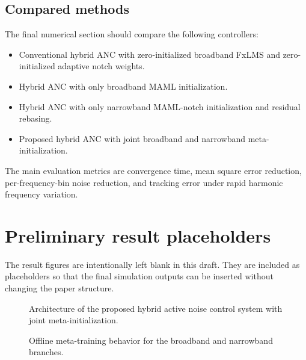 \documentclass{internoise2026}
\begin{document}
\subsection{Compared methods}

The final numerical section should compare the following controllers:
\begin{itemize}[noitemsep]
  \item Conventional hybrid ANC with zero-initialized broadband FxLMS and zero-initialized adaptive notch weights.
  \item Hybrid ANC with only broadband MAML initialization.
  \item Hybrid ANC with only narrowband MAML-notch initialization and residual rebasing.
  \item Proposed hybrid ANC with joint broadband and narrowband meta-initialization.
\end{itemize}
The main evaluation metrics are convergence time, mean square error reduction, per-frequency-bin noise reduction, and tracking error under rapid harmonic frequency variation.

\section{Preliminary result placeholders}

The result figures are intentionally left blank in this draft. They are included as placeholders so that the final simulation outputs can be inserted without changing the paper structure.

\begin{figure}[htbp!]
  \centering
  \caption{Architecture of the proposed hybrid active noise control system with joint meta-initialization.}
  \label{fig:block_diagram}
\end{figure}

\begin{figure}[htbp!]
  \centering
  \caption{Offline meta-training behavior for the broadband and narrowband branches.}
  \label{fig:training_curves}
\end{figure}
\end{document}
